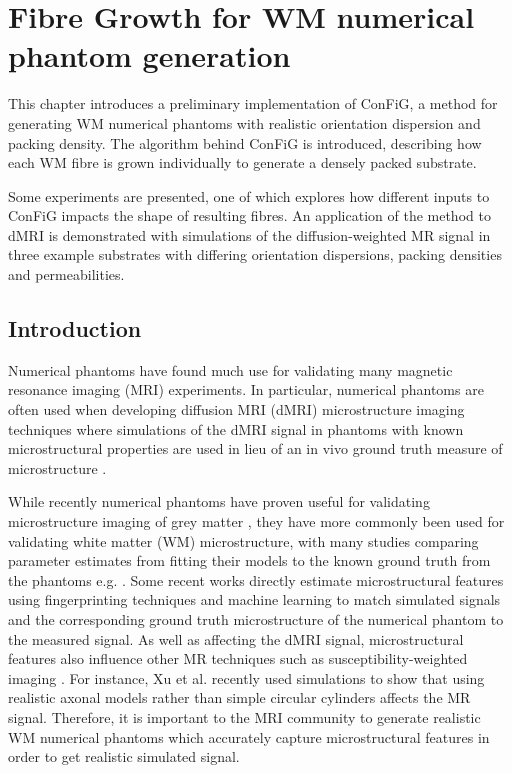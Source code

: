 \chapter{Fibre Growth for WM numerical phantom generation}
\label{chap:ipmi-implementation}

\chaptertoc{}

\begin{chapterabstract}
  This chapter introduces a preliminary implementation of \acf{ConFiG}, a method for generating \acf{WM} numerical phantoms with realistic orientation dispersion and packing density.
  The algorithm behind \ac{ConFiG} is introduced, describing how each \ac{WM} fibre is grown individually to generate a densely packed substrate.

  Some experiments are presented, one of which explores how different inputs to \ac{ConFiG} impacts the shape of resulting fibres.
  An application of the method to dMRI is demonstrated with simulations of the diffusion-weighted MR signal in three example substrates with differing orientation dispersions, packing densities and permeabilities.
\end{chapterabstract}


\section{Introduction}
\label{sec:Introduction}
Numerical phantoms have found much use for validating many magnetic resonance imaging (MRI) experiments.
In particular, numerical phantoms are often used when developing diffusion MRI (dMRI) microstructure imaging techniques where simulations of the dMRI signal in phantoms with known microstructural properties are used in lieu of an in vivo ground truth measure of microstructure \cite{Alexander2017}.

While recently numerical phantoms have proven useful for validating microstructure imaging of grey matter \cite{Palombo2020}, they have more commonly been used for validating white matter (WM) microstructure, with many studies comparing parameter estimates from fitting their models to the known ground truth from the phantoms e.g. \cite{Li2019,Jelescu2017,Scherrer2016,Tariq2016,Daducci2015,Nilsson2017,Xu2014,Zhang2012,Nilsson2010}.
Some recent works directly estimate microstructural features using fingerprinting techniques and machine learning to match simulated signals and the corresponding ground truth microstructure of the numerical phantom to the measured signal\cite{Hill2019,Palombo2018a,Rensonnet2018,Nedjati-Gilani2017}.
As well as affecting the dMRI signal, microstructural features also influence other MR techniques such as susceptibility-weighted imaging \cite{Li2012,Lee2010}.
For instance, Xu et al. \cite{Xu2018} recently used simulations to show that using realistic axonal models rather than simple circular cylinders affects the MR signal.
Therefore, it is important to the MRI community to generate realistic WM numerical phantoms which accurately capture microstructural features in order to get realistic simulated signal.

